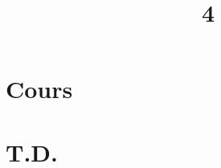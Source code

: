 \documentclass[a4paper]{article}
\title{4}{Diagonalisation \& trigonalisation}
\begin{document}
	\part{Cours}
	
	
	
	
	
	
	
	
	
	\clearpage\null\clearpage
	\renewcommand{\thesection}{}
	\renewcommand{\thesubsection}{}
	\part{T.D.}
	
	
	
	
	
\end{document}
